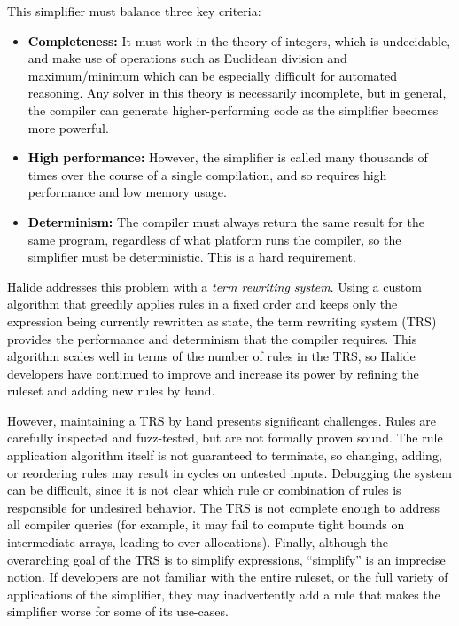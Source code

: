 \documentclass[acmsmall,review]{acmart}\settopmatter{printfolios=true,printccs=false,printacmref=false}
\newcommand{\modified}[1]{\textcolor{black}{{#1}}}
\begin{document}
\modified{This simplifier must balance three key criteria:}

\begin{itemize}
  \item \modified{\textbf{Completeness:}
It must work in 
the theory of integers, which is undecidable, and make use of operations such as 
Euclidean division and maximum/minimum which can be especially difficult for 
automated reasoning. Any solver in this theory is necessarily incomplete, but in general, 
the compiler can generate higher-performing code as the simplifier becomes more powerful.}
  \item \modified{\textbf{High performance:} However, the simplifier is called many thousands of 
times over the course of a single compilation, and so requires high performance and low memory usage. }
  \item \modified{\textbf{Determinism:} The compiler must always return the same 
result for the same program, regardless of what platform runs the compiler, 
so the simplifier must be deterministic. This is a hard requirement.}
\end{itemize}


\modified{Halide addresses this problem with a \emph{term rewriting system}. Using a custom algorithm 
that greedily applies rules in a fixed order and keeps only the expression being currently 
rewritten as state, the term rewriting system (TRS) provides the performance and determinism 
that the compiler requires. This algorithm scales well in terms of the number of rules
in the TRS, so Halide developers have continued to improve and increase its
power by refining the ruleset and adding new rules by hand.}

\modified{However, maintaining a TRS by hand presents significant challenges. Rules are 
carefully inspected and fuzz-tested, but are not formally proven sound. The 
rule application algorithm itself is not guaranteed to terminate, so changing, adding, or 
reordering rules may result in cycles on untested inputs. Debugging the system can be 
difficult, since it is not clear which rule or combination of rules is responsible for 
undesired behavior. The TRS is not complete enough to address all compiler queries 
(for example, it may fail to compute tight bounds on intermediate arrays, leading to over-allocations).
Finally, although the overarching goal of the TRS is to simplify 
expressions, ``simplify'' is an imprecise notion. If developers are not familiar with 
the entire ruleset, or the full variety of applications of the simplifier, they may inadvertently 
add a rule that makes the simplifier worse for some of its use-cases. }
\end{document}
